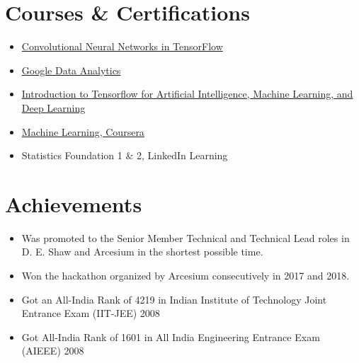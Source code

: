 \documentclass[letterpaper,11pt]{article}
\newcommand{\resumeSubHeadingListStart}{\begin{itemize}[leftmargin=*]}
\newcommand{\resumeSubHeadingListEnd}{\end{itemize}}
\newcommand{\resumeItemListEnd}{\end{itemize}\vspace{-5pt}}
\begin{document}
\section{Courses \& Certifications}
 \resumeSubHeadingListStart
 \item{
 \href{https://coursera.org/share/1dbaaf4342339a9a53bbc8d2bb9332fc}{Convolutional Neural Networks in TensorFlow}
}
\item{
\href{https://coursera.org/share/dbb7549a0d292aae7b6bdb7f4914a97c}{Google Data Analytics}
}
\item{
\href{https://coursera.org/share/cd990fdf3e32111eadc2c9635f56b539}{Introduction to Tensorflow for Artificial Intelligence, Machine Learning, and Deep Learning}}
  \item{
   \href{https://www.coursera.org/account/accomplishments/certificate/L8TAJG2CVTKR}{Machine Learning, Coursera}
  }
  \item{
  {Statistics Foundation 1 \& 2, LinkedIn Learning}
  }
 \resumeSubHeadingListEnd

\section{Achievements}
  \resumeSubHeadingListStart
    \item{
      Was promoted to the Senior Member Technical and Technical Lead roles in D. E. Shaw and Arcesium in the shortest possible time.
    }
    \item{
      Won the hackathon organized by Arcesium consecutively in 2017 and 2018.
    }
    \item{
      Got an All-India Rank of 4219 in Indian Institute of Technology Joint Entrance Exam (IIT-JEE) 2008
    }
    \item{
      Got All-India Rank of 1601 in All India Engineering Entrance Exam (AIEEE) 2008
    }
  \resumeItemListEnd

\end{document}
